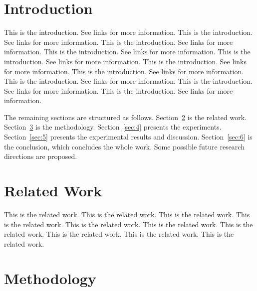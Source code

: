 \documentclass[journal,article,submit,moreauthors,pdftex]{Definitions/tsp}
\begin{document}
\section{Introduction}
\label{sec:1}

This is the introduction. See links \cite{liu2024efficient, yang2026builder, yang2025checker} for more information. This is the introduction. See links \cite{liu2024efficient, yang2026builder, yang2025checker} for more information. This is the introduction. See links \cite{liu2024efficient, yang2026builder, yang2025checker} for more information. This is the introduction. See links \cite{liu2024efficient, yang2026builder, yang2025checker} for more information. This is the introduction. See links \cite{liu2024efficient, yang2026builder, yang2025checker} for more information. This is the introduction. See links \cite{liu2024efficient, yang2026builder, yang2025checker} for more information. This is the introduction. See links \cite{liu2024efficient, yang2026builder, yang2025checker} for more information. This is the introduction. See links \cite{liu2024efficient, yang2026builder, yang2025checker} for more information. This is the introduction. See links \cite{liu2024efficient, yang2026builder, yang2025checker} for more information. This is the introduction. See links \cite{liu2024efficient, yang2026builder, yang2025checker} for more information. 

The remaining sections are structured as follows. Section~\ref{sec:2} is the related work. Section~\ref{sec:3} is the methodology. Section~\ref{sec:4} presents the experiments. Section~\ref{sec:5} presents the experimental results and discussion. Section~\ref{sec:6} is the conclusion, which concludes the whole work. Some possible future research directions are proposed. 

\section{Related Work}
\label{sec:2}

This is the related work. This is the related work. This is the related work. This is the related work. This is the related work. This is the related work. This is the related work. This is the related work. This is the related work. This is the related work. 

\section{Methodology}
\label{sec:3}
\end{document}
